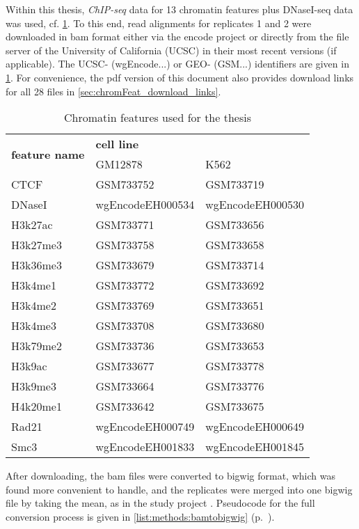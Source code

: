 Within this thesis, \emph{ChIP-seq} data for 13 chromatin features plus DNaseI-seq data was used, cf. \cref{tab:methods:csdata}.
To this end, read alignments for replicates 1 and 2 were downloaded in bam format either via the \acrshort{encode} project \cite{Encode2012,Davis2017} 
or directly from the file server of the University of California (UCSC) in their most recent versions (if applicable).
The UCSC- (wgEncode...) or GEO- (GSM...) identifiers are given in \cref{tab:methods:csdata}.
For convenience, the pdf version of this document also provides download links for all 28 files in \cref{sec:chromFeat_download_links}.
\begin{table}[ht!]
\centering
 \begin{tabular}{lll}
 \hline
  \multicolumn{1}{c}{\multirow{2}{*}{\textbf{feature name}}} & \multicolumn{2}{l}{\hspace*{18mm}\textbf{cell line}} \\
\multicolumn{1}{c}{}                                       & GM12878             & K562             \\ \hline
  CTCF & GSM733752 & GSM733719\\
  DNaseI & wgEncodeEH000534 & wgEncodeEH000530\\
  H3k27ac & GSM733771 & GSM733656\\
  H3k27me3 &GSM733758 & GSM733658\\
  H3k36me3 &GSM733679 & GSM733714\\
  H3k4me1  &GSM733772 & GSM733692\\
  H3k4me2  &GSM733769 & GSM733651\\
  H3k4me3 &GSM733708 & GSM733680\\
  H3k79me2 &GSM733736	& GSM733653	\\
  H3k9ac &GSM733677 & GSM733778\\
  H3k9me3 &GSM733664 & GSM733776	\\
  H4k20me1 &GSM733642 & GSM733675\\
  Rad21 &	wgEncodeEH000749 & wgEncodeEH000649\\
  Smc3 & 	wgEncodeEH001833 & wgEncodeEH001845\\ \hline
 \end{tabular}
 \caption{Chromatin features used for the thesis} \label{tab:methods:csdata}
\end{table}
After downloading, the bam files were converted to bigwig format, which was found more convenient to handle, and the replicates were merged into 
one bigwig file by taking the mean, as in the study project \cite{Krauth2020}. 
Pseudocode for the full conversion process is given in \cref{list:methods:bamtobigwig} (p.~\pageref{list:methods:bamtobigwig}).

